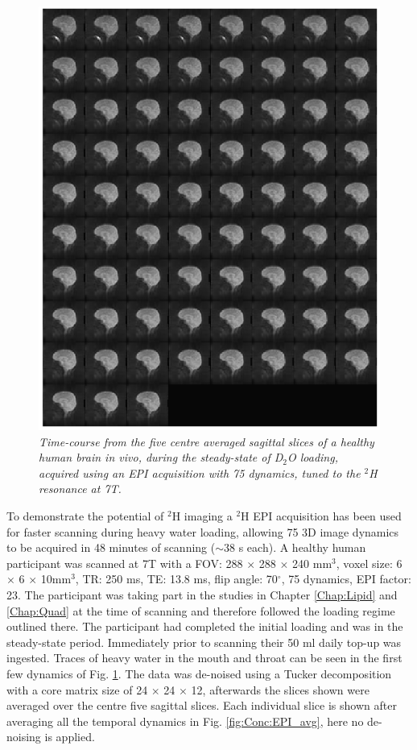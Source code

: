 \begin{figure}[H]
    \centering
    \includegraphics[width=1\textwidth]{Figures/D2O/EPI.png}
    \caption{\textit{Time-course from the five centre averaged sagittal slices of a healthy human brain in vivo, during the steady-state of D$_2$O loading, acquired using an \ac{EPI} acquisition with 75 dynamics, tuned to the $^2$H resonance at 7T.}}
    \label{fig:Conc:EPI}
\end{figure}

To demonstrate the potential of $^2$H imaging a $^2$H \ac{EPI} acquisition has been used for faster scanning during heavy water loading, allowing 75 3D image dynamics to be acquired in 48 minutes of scanning ($\sim$38 s each). A healthy human participant was scanned at 7T with a \ac{FOV}: 288 $\times$ 288 $\times$ 240 mm$^3$, voxel size: 6 $\times$ 6 $\times$ 10mm$^3$, \ac{TR}: 250 ms, TE: 13.8 ms, flip angle: 70$^\circ$, 75 dynamics, \ac{EPI} factor: 23. The participant was taking part in the studies in Chapter \ref{Chap:Lipid} and \ref{Chap:Quad} at the time of scanning and therefore followed the loading regime outlined there. The participant had completed the initial loading and was in the steady-state period. Immediately prior to scanning their 50 ml daily top-up was ingested. Traces of heavy water in the mouth and throat can be seen in the first few dynamics of Fig. \ref{fig:Conc:EPI}. The data was de-noised using a Tucker decomposition with a core matrix size of 24 $\times$ 24 $\times$ 12, afterwards the slices shown were averaged over the centre five sagittal slices. Each individual slice is shown after averaging all the temporal dynamics in Fig. \ref{fig:Conc:EPI_avg}, here no de-noising is applied.

